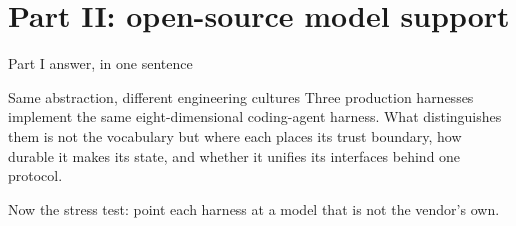 \documentclass[aspectratio=169,11pt]{beamer}
\begin{document}
\section{Part II: open-source model support}

\begin{frame}{Part I answer, in one sentence}
  \begin{block}{Same abstraction, different engineering cultures}
    Three production harnesses implement the same eight-dimensional
    coding-agent harness. What distinguishes them is not the vocabulary
    but where each places its trust boundary, how durable it makes its
    state, and whether it unifies its interfaces behind one protocol.
  \end{block}
  \medskip
  Now the stress test: point each harness at a model that is not the
  vendor's own.
\end{frame}
\end{document}

